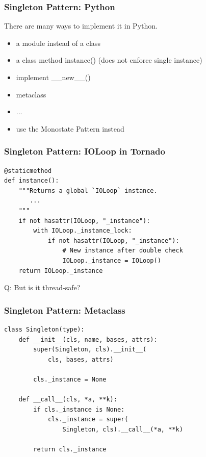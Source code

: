 \documentclass{beamer}
\begin{document}
\begin{frame}
\frametitle{Singleton Pattern: Python}
There are many ways to implement it in Python.
  \begin{itemize}
   \item a module instead of a class
   \item a class method instance() (does not enforce single instance)
   \item implement \_\_new\_\_()
   \item metaclass
   \item ...
   \item use the Monostate Pattern instead
  \end{itemize}
\end{frame}

\begin{frame}[fragile]
\frametitle{Singleton Pattern: IOLoop in Tornado}
\begin{footnotesize}
\begin{verbatim}
@staticmethod
def instance():
    """Returns a global `IOLoop` instance.
       ...
    """
    if not hasattr(IOLoop, "_instance"):
        with IOLoop._instance_lock:
            if not hasattr(IOLoop, "_instance"):
                # New instance after double check
                IOLoop._instance = IOLoop()
    return IOLoop._instance
\end{verbatim}
\end{footnotesize}
\linebreak
Q: But is it thread-safe?
\end{frame}

\begin{frame}[fragile]
\frametitle{Singleton Pattern: Metaclass}
\begin{verbatim}
class Singleton(type):
    def __init__(cls, name, bases, attrs):
        super(Singleton, cls).__init__(
            cls, bases, attrs)
        
        cls._instance = None

    def __call__(cls, *a, **k):
        if cls._instance is None:
            cls._instance = super(
                Singleton, cls).__call__(*a, **k)

        return cls._instance
\end{verbatim}
\end{frame}
\end{document}
